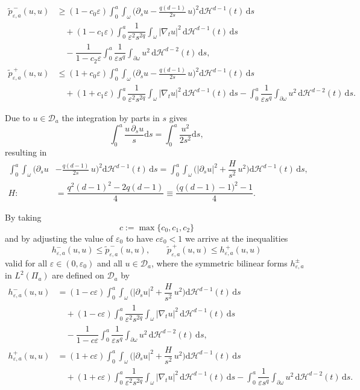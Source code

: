\documentclass[11pt,oneside,reqno,a4paper]{amsart}
\renewcommand{\Tilde}{\widetilde}
\newcommand{\dd}{\mathrm{d}}
\newcommand{\cD}{\mathcal{D}}
\renewcommand{\H}{\mathcal{H}}
\newcommand{\eps}{\varepsilon}
\theoremstyle{definition}
\begin{document}
\begin{align*}
\Tilde p^{\,-}_{\eps,a}(u,u)&\ge (1-c_0\eps)\int_0^a \int_{\omega}\Big(\partial_su -\frac{q(d-1)}{2s}\, u\Big)^2\dd\H^{d-1}(t)\,\dd s\\
	&\quad +(1-c_1\eps)\int_0^a \dfrac{1}{\eps^2s^{2q}}\int_{\omega}|\nabla_tu|^2\,\dd\H^{d-1}(t)\,\dd s\\
	&\quad- \dfrac{1}{1-c_2\eps}\int_0^a \dfrac{1}{\eps s^q}
	\int_{\partial\omega}u^2\,\dd\H^{d-2}(t)\,\dd s,\\
\Tilde p^{\,+}_{\eps,a}(u,u)&\le (1+c_0\eps)\int_0^a \int_{\omega}\Big(\partial_su -\frac{q(d-1)}{2s}\, u\Big)^2\dd\H^{d-1}(t)\,\dd s\\
	&\quad +(1+c_1\eps)\int_0^a \dfrac{1}{\eps^2s^{2q}}\int_{\omega}|\nabla_tu|^2\,\dd\H^{d-1}(t)\,\dd s-\int_0^a \dfrac{1}{\eps s^q}
	\int_{\partial\omega}u^2\,\dd\H^{d-2}(t)\,\dd s.
\end{align*}


Due to $u\in \cD_a$ the integration by parts in $s$ gives
\[
\int_{0}^a\frac{u\,\partial_su}{s}\dd s=\int_0^a\frac{u^2}{2s^2}\dd s,
\]
resulting in
\begin{align}
\int_0^a \int_{\omega}\Big(\partial_su &-\frac{q(d-1)}{2s}\, u\Big)^2\dd\H^{d-1}(t)\,\dd s=\int_0^a \int_{\omega}\bigg(|\partial_su|^2+\dfrac{H}{s^2}\,u^2\bigg)\dd\H^{d-1}(t)\,\dd s,\nonumber\\
H:&=\dfrac{q^2(d-1)^2-2q(d-1)}{4}\equiv \dfrac{\big(q(d-1)-1\big)^2-1}{4}.\label{hhh}
\end{align}

By taking
\[
c:=\max\{c_0,c_1,c_2\}
\]
and by adjusting the value of $\eps_0$ to have $c\eps_0<1$ we arrive at
the inequalities
\[
h^-_{\eps,a}(u,u)\le \Tilde p^{\,-}_{\eps,a}(u,u), \qquad
\Tilde p^{\,+}_{\eps,a}(u,u)\le h^{\,+}_{\eps,a}(u,u)
\]
valid for all $\eps\in(0,\eps_0)$ and all $u\in\cD_a$, where
the symmetric bilinear forms $h^\pm_{\eps,a}$ in $L^2(\Pi_a)$ are defined on $\cD_a$ by
\begin{align*}
h^{-}_{\eps,a}(u,u)&= (1-c\eps)\int_0^a \int_{\omega}\bigg(|\partial_su|^2+\dfrac{H}{s^2}\,u^2\bigg)\dd\H^{d-1}(t)\,\dd s\\
&\quad +(1-c\eps)\int_0^a \dfrac{1}{\eps^2s^{2q}}\int_{\omega}|\nabla_tu|^2\,\dd\H^{d-1}(t)\,\dd s\\
&\quad- \dfrac{1}{1-c\eps}\int_0^a \dfrac{1}{\eps s^q}
\int_{\partial\omega}u^2\,\dd\H^{d-2}(t)\,\dd s,\\
h^{+}_{\eps,a}(u,u)&= (1+c\eps)\int_0^a \int_{\omega}\bigg(|\partial_su|^2+\dfrac{H}{s^2}\,u^2\bigg)\dd\H^{d-1}(t)\,\dd s\\
&\quad +(1+c\eps)\int_0^a \dfrac{1}{\eps^2s^{2q}}\int_{\omega}|\nabla_tu|^2\,\dd\H^{d-1}(t)\,\dd s-\int_0^a \dfrac{1}{\eps s^q}
\int_{\partial\omega}u^2\,\dd\H^{d-2}(t)\,\dd s.
\end{align*}
\end{document}
